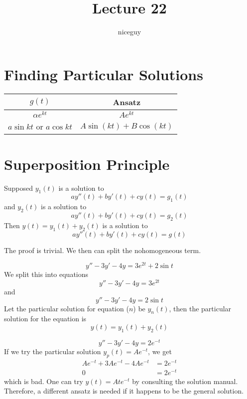 \documentclass[12pt]{article}
\author{niceguy}
\title{Lecture 22}
\begin{document}
\maketitle

\section{Finding Particular Solutions}

\begin{tabular}{|c|c|}
	\hline
	$g(t)$ & Ansatz \\
	\hline\hline
	$\alpha e^{kt}$ & $Ae^{kt}$ \\
	\hline
	$a\sin kt$ or $a\cos kt$ & $A\sin(kt) + B\cos(kt)$ \\
	\hline
\end{tabular}

\section{Superposition Principle}

\begin{thm}
	Supposed $y_1(t)$ is a solution to
	$$ay''(t) + by'(t) + cy(t) = g_1(t)$$
	and $y_2(t)$ is a solution to
	$$ay''(t) + by'(t) + cy(t) = g_2(t)$$
	Then $y(t) = y_1(t) + y_2(t)$ is a solution to
	$$ay''(t) + by'(t) + cy(t) = g(t)$$
\end{thm}

The proof is trivial. We then can split the nohomogeneous term.

\begin{ex}
	$$y'' - 3y' - 4y = 3e^{2t} + 2\sin t$$
	We split this into equations
	\begin{equation}\label{a}
		y'' - 3y' - 4y = 3e^{2t}
	\end{equation}
	and
	\begin{equation}\label{b}
		y'' - 3y' - 4y = 2\sin t
	\end{equation}
	Let the particular solution for equation ($n$) be $y_n(t)$, then the particular solution for the equation is
	$$y(t) = y_1(t) + y_2(t)$$
\end{ex}

\begin{ex}
	$$y'' - 3y' - 4y = 2e^{-t}$$
	If we try the particular solution $y_p(t) = Ae^{-t}$, we get
	\begin{align*}
		Ae^{-t} + 3Ae^{-t} - 4Ae^{-t} &= 2e^{-t} \\
		0 &= 2e^{-t}
	\end{align*}
	which is bad. One can try $y(t) = Ate^{-t}$ by consulting the solution manual. Therefore, a different ansatz is needed if it happens to be the general solution.
\end{ex}
\end{document}
